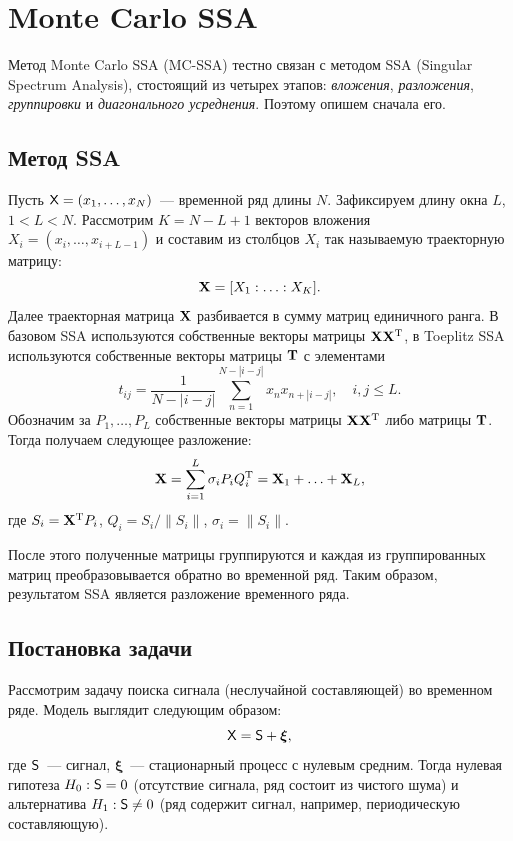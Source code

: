 \documentclass[specialist,
substylefile = spbu_report.rtx,
subf,href,colorlinks=true, 12pt]{disser}
\theoremstyle{definition}
\newtheorem{definition}{Определение}[section]
\begin{document}
\section{Monte Carlo SSA}
Метод Monte Carlo SSA (MC-SSA) тестно связан с методом SSA (Singular Spectrum Analysis), стостоящий из четырех этапов: \emph{вложения}, \emph{разложения}, \emph{группировки} и \emph{диагонального усреднения}. Поэтому опишем сначала его.
\subsection{Метод SSA}
Пусть $\mathsf{X}=(x_1,\ldots,x_N)$~--- временной ряд длины $N$. Зафиксируем длину окна $L$, $1<L<N$. Рассмотрим $K=N-L+1$ векторов вложения $X_i=(x_i,\ldots,x_{i+L-1})$ и составим из столбцов $X_i$ так называемую траекторную матрицу:
\[
	\mathbf{X} = [X_1:\ldots:X_K].
\]
Далее траекторная матрица $\mathbf{X}$ разбивается в сумму матриц единичного ранга. В базовом SSA используются собственные векторы матрицы $\mathbf{X}\mathbf{X}^{\mathrm{T}}$, в Toeplitz SSA используются собственные векторы матрицы $\mathbf{T}$ с элементами
\begin{equation}\label{eq:toeplitz}
	t_{ij} = \frac{1}{N - |i - j|}\sum_{n=1}^{N - |i - j|}x_n x_{n+|i-j|},\quad i,j\leqslant L.
\end{equation}
Обозначим за $P_1,\ldots,P_L$ собственные векторы матрицы $\mathbf{X}\mathbf{X}^{\mathrm{T}}$ либо матрицы $\mathbf{T}$. Тогда получаем следующее разложение:
\[
	\mathbf{X} = \sum_{i=1}^L \sigma_i P_i Q_i^{\mathrm{T}} = \mathbf{X}_1+\ldots+\mathbf{X}_L,
\]
где $S_i=\mathbf{X}^{\mathrm{T}} P_i$, $Q_i=S_i/\|S_i\|$, $\sigma_i=\|S_i\|$.

После этого полученные матрицы группируются и каждая из группированных матриц преобразовывается обратно во временной ряд. Таким образом, результатом SSA является разложение временного ряда.
\subsection{Постановка задачи}
Рассмотрим задачу поиска сигнала (неслучайной составляющей) во временном ряде. Модель выглядит следующим образом:
\[
	\mathsf{X}=\mathsf{S} + \bm\xi,
\]
где $\mathsf{S}$~--- сигнал, $\bm\xi$~--- стационарный процесс с нулевым средним. Тогда нулевая гипотеза $H_0:\mathsf{S}=0$ (отсутствие сигнала, ряд состоит из чистого шума) и альтернатива $H_1:\mathsf{S}\ne0$ (ряд содержит сигнал, например, периодическую составляющую).
\end{document}
